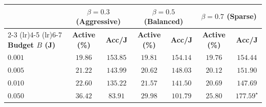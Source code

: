 \documentclass{interact}
\begin{document}
\begin{table}[htbp]
    {\begin{tabular}{@{}lcccccc@{}}
            \toprule
                                    & \multicolumn{2}{c}{\textbf{$\beta = 0.3$ (Aggressive)}} & \multicolumn{2}{c}{\textbf{$\beta = 0.5$ (Balanced)}} & \multicolumn{2}{c}{\textbf{$\beta = 0.7$ (Sparse)}}                                                            \\
            \cmidrule(lr){2-3} \cmidrule(lr){4-5} \cmidrule(lr){6-7}
            \textbf{Budget $B$ (J)} & \textbf{Active (\%)}                                    & \textbf{Acc/J}                                        & \textbf{Active (\%)}                                & \textbf{Acc/J} & \textbf{Active (\%)} & \textbf{Acc/J}   \\
            \midrule
            $0.001$                 & $19.86$                                                 & $153.85$                                              & $19.81$                                             & $154.14$       & $19.76$              & $154.44$         \\
            $0.005$                 & $21.22$                                                 & $143.99$                                              & $20.62$                                             & $148.03$       & $20.12$              & $151.90$         \\
            $0.010$                 & $22.60$                                                 & $135.22$                                              & $21.57$                                             & $141.50$       & $20.69$              & $147.69$         \\
            $0.050$                 & $36.42$                                                 & $83.91$                                               & $29.98$                                             & $101.79$       & $25.80$              & $177.59^{\star}$ \\
            \bottomrule
        \end{tabular}}
    \label{tab:factorial_search}
\end{table}
\end{document}
